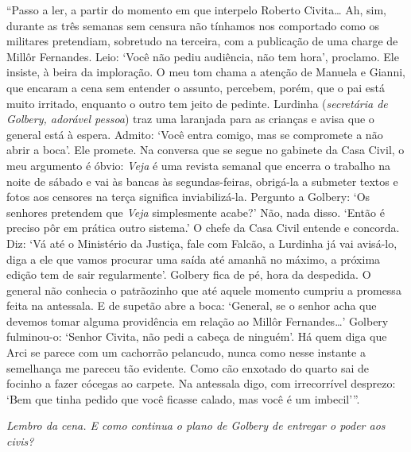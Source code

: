 ``Passo a ler, a partir do momento em que interpelo Roberto
Civita\ldots{} Ah, sim, durante as três semanas sem censura não tínhamos
nos comportado como os militares pretendiam, sobretudo na terceira, com
a publicação de uma charge de Millôr Fernandes. Leio: `Você não pediu
audiência, não tem hora', proclamo. Ele insiste, à beira da imploração.
O meu tom chama a atenção de Manuela e Gianni, que encaram a cena sem
entender o assunto, percebem, porém, que o pai está muito irritado,
enquanto o outro tem jeito de pedinte. Lurdinha (\emph{secretária de
Golbery, adorável pessoa}) traz uma laranjada para as crianças e avisa
que o general está à espera. Admito: `Você entra comigo, mas se
compromete a não abrir a boca'. Ele promete. Na conversa que se segue no
gabinete da Casa Civil, o meu argumento é óbvio: \emph{Veja} é uma
revista semanal que encerra o trabalho na noite de sábado e vai às
bancas às segundas-feiras, obrigá-la a submeter textos e fotos aos
censores na terça significa inviabilizá-la. Pergunto a Golbery: `Os
senhores pretendem que \emph{Veja} simplesmente acabe?' Não, nada disso.
`Então é preciso pôr em prática outro sistema.' O chefe da Casa Civil
entende e concorda. Diz: `Vá até o Ministério da Justiça, fale com
Falcão, a Lurdinha já vai avisá-lo, diga a ele que vamos procurar uma
saída até amanhã no máximo, a próxima edição tem de sair regularmente'.
Golbery fica de pé, hora da despedida. O general não conhecia o
patrãozinho que até aquele momento cumpriu a promessa feita na
antessala. E de supetão abre a boca: `General, se o senhor acha que
devemos tomar alguma providência em relação ao Millôr Fernandes\ldots{}'
Golbery fulminou-o: `Senhor Civita, não pedi a cabeça de ninguém'. Há
quem diga que Arci se parece com um cachorrão pelancudo, nunca como
nesse instante a semelhança me pareceu tão evidente. Como cão enxotado
do quarto sai de focinho a fazer cócegas ao carpete. Na antessala digo,
com irrecorrível desprezo: `Bem que tinha pedido que você ficasse
calado, mas você é um imbecil'''.

\itshape
 Lembro da cena. E como continua o plano de Golbery de
entregar o poder aos civis?

